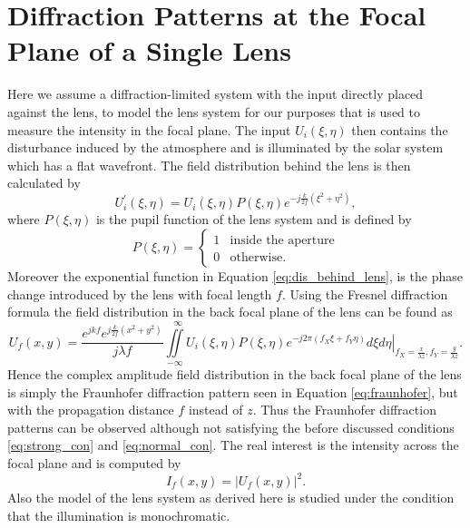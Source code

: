 \documentclass{article}
\begin{document}
\section{Diffraction Patterns at the Focal Plane of a Single Lens}
Here we assume a diffraction-limited system with the input directly placed against the lens, to model the lens system for our purposes that is used to measure the intensity in the focal plane. The input $U_i(\xi,\eta)$ then contains the disturbance induced by the atmosphere and is illuminated by the solar system which has a flat wavefront. The field distribution behind the lens is then calculated by
\begin{equation}
U^\prime_i(\xi,\eta)=U_i(\xi,\eta)P(\xi,\eta)e^{-j\frac{k}{2f}(\xi^2 + \eta^2)},
\label{eq:dis_behind_lens}
\end{equation}
where $P(\xi,\eta)$ is the pupil function of the lens system and is defined by
\begin{equation}
P(\xi,\eta)= \begin{cases} 1 & \text{inside the aperture} \\ 0 & \text{otherwise.} \end{cases}
\end{equation}
Moreover the exponential function in Equation \eqref{eq:dis_behind_lens}, is the phase change introduced by the lens with focal length $f$. Using the Fresnel diffraction formula the field distribution in the back focal plane of the lens can be found as
\begin{equation}
U_f(x,y)=\frac{e^{jkf}e^{j\frac{k}{2f}(x^2+y^2)}}{j\lambda f}\iint\limits_{-\infty}^{~~~\infty} \left. U_i(\xi,\eta)P(\xi,\eta)e^{-j2\pi(f_X\xi+f_Y\eta)}d\xi d\eta \right|_{f_X=\frac{x}{\lambda z},f_Y=\frac{y}{\lambda z}}.
\label{eq:fresnel}
\end{equation}
Hence the complex amplitude field distribution in the back focal plane of the lens is simply the Fraunhofer diffraction pattern seen in Equation \eqref{eq:fraunhofer}, but with the propagation distance $f$ instead of $z$. Thus the Fraunhofer diffraction patterns can be observed although not satisfying the before discussed conditions \eqref{eq:strong_con} and \eqref{eq:normal_con}. The real interest is the intensity across the focal plane and is computed by
\begin{equation}
I_f(x,y)=|U_f(x,y)|^2.
\end{equation}
Also the model of the lens system as derived here is studied under the condition that the illumination is monochromatic. 
\end{document}
